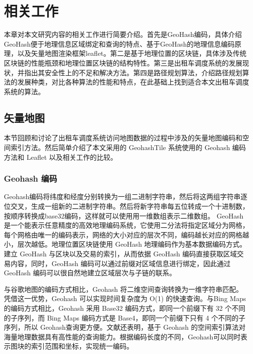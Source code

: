 \chapter{相关工作}
本章对本文研究内容的相关工作进行简要介绍。首先是GeoHash编码，具体介绍GeoHash便于地理信息区域绑定和查询的特点、基于GeoHash的地理信息编码原理，以及矢量地图渲染框架leaflet。第二是基于地理位置的区块链，具体涉及传统区块链的性能瓶颈和地理位置区块链的结构特性。第三是出租车调度系统的发展现状，并指出其安全性上的不足和解决方法。第四是路径规划算法，介绍路径规划算法的发展种类，对比各种算法的性能和特点，在此基础上找到适合本文出租车调度系统的算法。

\section{矢量地图}
本节回顾和讨论了出租车调度系统访问地图数据的过程中涉及的矢量地图编码和空间索引方法。然后简单介绍了本文采用的 GeohashTile 系统使用的 Geohash 编码方法和 Leaflet 以及相关工作的比较。

\subsection{Geohash 编码}
Geohash编码将纬度和经度分别转换为一组二进制字符串，然后将这两组字符串逐位交叉，生成一组新的二进制字符串。然后将新字符串每五位转成一个十进制数，按顺序转换成base32编码，这样就可以使用用一维数组表示二维数组。
GeoHash 是一个能表示任意精度的高效地理编码系统，它使用二分法将指定区域分为网格，每个网格由唯一的编码表示，网络的大小对应的层次不同，编码越长对应的网格越小，层次越低。地理位置区块链使用 GeoHash 地理编码作为基本数据编码方式。建立 GeoHash 与区块以及交易的索引，从而依据 GeoHash 编码直接获取区域交易内容，同时，GeoHash 编码可以通过前缀对区域信息进行绑定，因此通过 GeoHash 编码可以很自然地建立区域层次与子链的联系。

与谷歌地图的编码方式相比，Geohash 将二维空间查询转换为一维字符串匹配。凭借这一优势，Geohash 可以实现时间复杂度为 O(1)  的快速查询。与Bing Maps的编码方式相比，Geohash 采用 Base32 编码方式，即同一个前缀下有 32 个不同的子序列，而 Bing Maps 编码方式是 Base4，即同一个前缀下只有 4 个不同的子序列，所以 Geohash查询更方便。文献还表明，基于 Geohash 的空间索引算法对海量地理数据具有高性能的查询能力。根据编码长度的不同，Geohash可以同时表示图块的索引范围和坐标，实现统一编码。

